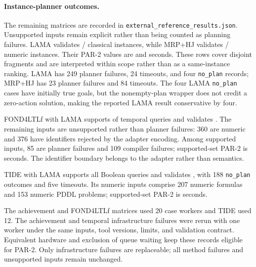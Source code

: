 



\paragraph{Instance-planner outcomes.}
The remaining matrices are recorded in
\texttt{external\_reference\_results.json}. Unsupported inputs remain explicit
rather than being counted as planning failures.
LAMA validates \ExternalLAMAValidCount{}/\ExternalLAMACaseCount{} classical
instances, while MRP+HJ validates
\ExternalMRPHJValidCount{}/\ExternalMRPHJCaseCount{} numeric instances. Their
PAR-2 values are \ExternalLAMAParTwoSeconds{} and
\ExternalMRPHJParTwoSeconds{} seconds. These rows cover disjoint fragments and
are interpreted within scope rather than as a same-instance ranking. LAMA has
249 planner failures, 24 timeouts, and four \texttt{no\_plan} records; MRP+HJ
has 23 planner failures and 84 timeouts. The four LAMA \texttt{no\_plan} cases
have initially true goals, but the nonempty-plan wrapper does not credit a
zero-action solution, making the reported LAMA result conservative by four.

FOND4LTLf with LAMA supports \ExternalDirectSupportedCount{} of
\ExternalDirectTotalCaseCount{} temporal queries and validates
\ExternalDirectValidCount{}. The remaining
\ExternalDirectUnsupportedCount{} inputs are unsupported rather than planner
failures: 360 are numeric and 376 have identifiers rejected by the adapter
encoding. Among supported inputs, 85 are planner failures and 109 compiler
failures; supported-set PAR-2 is \ExternalDirectParTwoSeconds{} seconds. The
identifier boundary belongs to the adapter rather than \ltlf{} semantics.

TIDE with LAMA supports all \ExternalTIDESupportedCount{} Boolean queries and
validates \ExternalTIDEValidCount{}, with 188 \texttt{no\_plan} outcomes and
five timeouts. Its \ExternalTIDEUnsupportedCount{} numeric inputs comprise 207
numeric formulas and 153 numeric PDDL problems; supported-set PAR-2 is
\ExternalTIDEParTwoSeconds{} seconds.

The achievement and FOND4LTLf matrices used 20 case workers and TIDE used 12.
The \ExternalAchievementRepairCount{} achievement and
\ExternalDirectRepairCount{} temporal infrastructure failures were rerun with
one worker under the same inputs, tool versions, limits, and validation
contract. Equivalent hardware and exclusion of queue waiting keep these records
eligible for PAR-2. Only infrastructure failures are replaceable; all method
failures and unsupported inputs remain unchanged.

